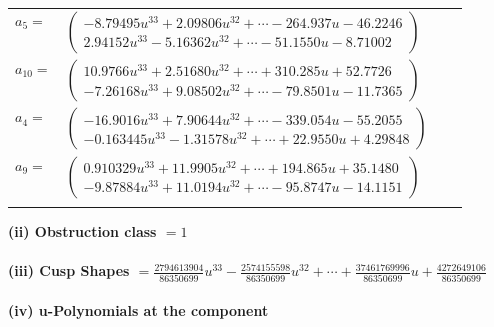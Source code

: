 \documentclass[1p]{elsarticle_modified}
\theoremstyle{definition}
\begin{document}
\begin{tabular}{m{7pt} m{180pt} m{7pt} m{180pt} }
\flushright $a_{5}=$&$\begin{pmatrix}-8.79495 u^{33}+2.09806 u^{32}+\cdots-264.937 u-46.2246\\2.94152 u^{33}-5.16362 u^{32}+\cdots-51.1550 u-8.71002\end{pmatrix}$ \\
\flushright $a_{10}=$&$\begin{pmatrix}10.9766 u^{33}+2.51680 u^{32}+\cdots+310.285 u+52.7726\\-7.26168 u^{33}+9.08502 u^{32}+\cdots-79.8501 u-11.7365\end{pmatrix}$ \\
\flushright $a_{4}=$&$\begin{pmatrix}-16.9016 u^{33}+7.90644 u^{32}+\cdots-339.054 u-55.2055\\-0.163445 u^{33}-1.31578 u^{32}+\cdots+22.9550 u+4.29848\end{pmatrix}$ \\
\flushright $a_{9}=$&$\begin{pmatrix}0.910329 u^{33}+11.9905 u^{32}+\cdots+194.865 u+35.1480\\-9.87884 u^{33}+11.0194 u^{32}+\cdots-95.8747 u-14.1151\end{pmatrix}$\\&\end{tabular}
\flushleft \textbf{(ii) Obstruction class $= 1$}\\~\\
\flushleft \textbf{(iii) Cusp Shapes $= \frac{2794613904}{86350699} u^{33}-\frac{2574155598}{86350699} u^{32}+\cdots+\frac{37461769996}{86350699} u+\frac{4272649106}{86350699}$}\\~\\
\newpage\renewcommand{\arraystretch}{1}
\flushleft \textbf{(iv) u-Polynomials at the component}\newline \\
\end{document}
